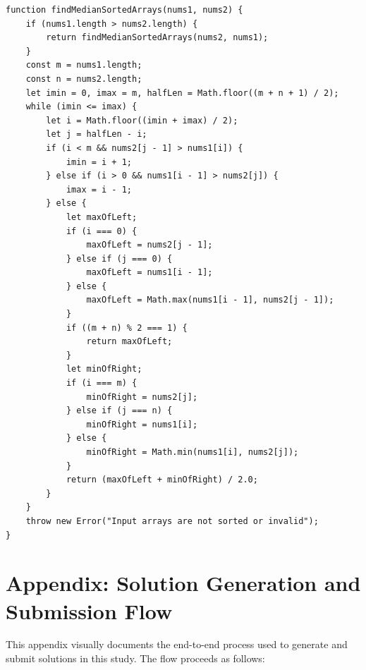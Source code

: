 \documentclass[12pt, a4paper]{article}
\begin{document}
\begin{verbatim}
function findMedianSortedArrays(nums1, nums2) {
    if (nums1.length > nums2.length) {
        return findMedianSortedArrays(nums2, nums1);
    }
    const m = nums1.length;
    const n = nums2.length;
    let imin = 0, imax = m, halfLen = Math.floor((m + n + 1) / 2);
    while (imin <= imax) {
        let i = Math.floor((imin + imax) / 2);
        let j = halfLen - i;
        if (i < m && nums2[j - 1] > nums1[i]) {
            imin = i + 1;
        } else if (i > 0 && nums1[i - 1] > nums2[j]) {
            imax = i - 1;
        } else {
            let maxOfLeft;
            if (i === 0) {
                maxOfLeft = nums2[j - 1];
            } else if (j === 0) {
                maxOfLeft = nums1[i - 1];
            } else {
                maxOfLeft = Math.max(nums1[i - 1], nums2[j - 1]);
            }
            if ((m + n) % 2 === 1) {
                return maxOfLeft;
            }
            let minOfRight;
            if (i === m) {
                minOfRight = nums2[j];
            } else if (j === n) {
                minOfRight = nums1[i];
            } else {
                minOfRight = Math.min(nums1[i], nums2[j]);
            }
            return (maxOfLeft + minOfRight) / 2.0;
        }
    }
    throw new Error("Input arrays are not sorted or invalid");
}
\end{verbatim}

\section{Appendix: Solution Generation and Submission Flow}
\label{sec:submission_flow}

This appendix visually documents the end-to-end process used to generate and submit solutions in this study. The flow proceeds as follows:
\end{document}
